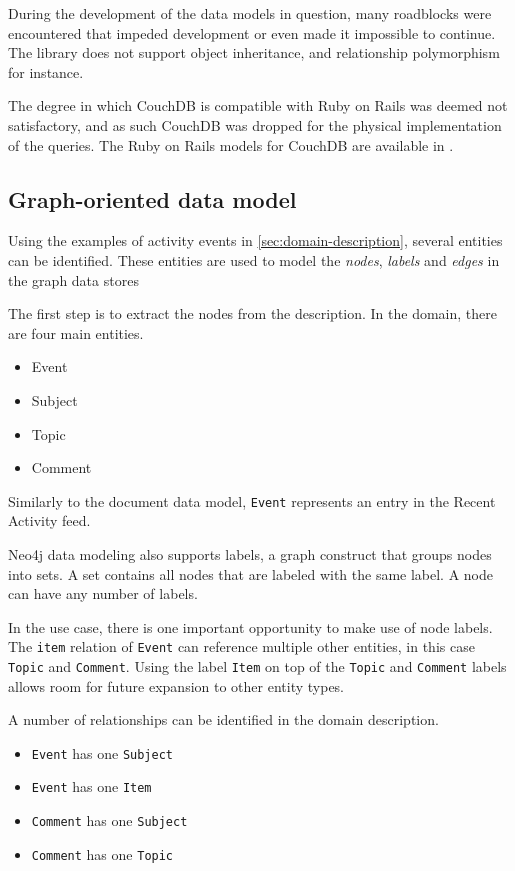 During the development of the data models in question, many roadblocks were encountered that impeded development or even made it impossible to continue.
The library does not support object inheritance, and relationship polymorphism for instance.

The degree in which CouchDB is compatible with Ruby on Rails was deemed not satisfactory, and as such CouchDB was dropped for the physical implementation of the queries.
The Ruby on Rails models for CouchDB are available in .

\subsection{Graph-oriented data model}
\label{subsec:graph-data-model}

Using the examples of activity events in \cref{sec:domain-description}, several entities can be identified.
These entities are used to model the \textit{nodes}, \textit{labels} and \textit{edges} in the graph data stores

The first step is to extract the nodes from the description.
In the domain, there are four main entities.

\begin{itemize}
  \item Event
  \item Subject
  \item Topic
  \item Comment
\end{itemize}

Similarly to the document data model, \texttt{Event} represents an entry in the Recent Activity feed.

Neo4j data modeling also supports labels, a graph construct that groups nodes into sets.
A set contains all nodes that are labeled with the same label.
A node can have any number of labels.

In the use case, there is one important opportunity to make use of node labels.
The \texttt{item} relation of \texttt{Event} can reference multiple other entities, in this case \texttt{Topic} and \texttt{Comment}.
Using the label \texttt{Item} on top of the \texttt{Topic} and \texttt{Comment} labels allows room for future expansion to other entity types.

A number of relationships can be identified in the domain description.

\begin{itemize}
  \item \texttt{Event} has one \texttt{Subject}
  \item \texttt{Event} has one \texttt{Item}
  \item \texttt{Comment} has one \texttt{Subject}
  \item \texttt{Comment} has one \texttt{Topic}
\end{itemize}

